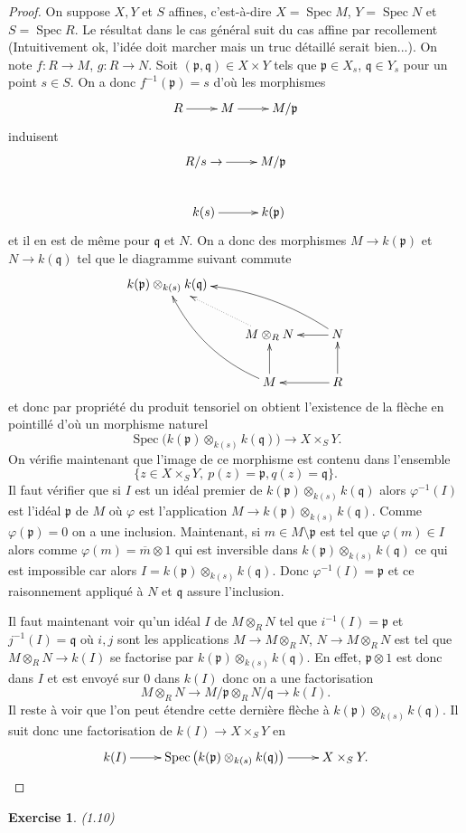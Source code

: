 \documentclass[A4, 11pt]{article}
\newtheorem{exer}{Exercise}
\def\Spec{ \operatorname{Spec}}
\begin{document}
 \begin{proof}
 On suppose $X,Y$ et $S$ affines, c'est-à-dire $X=\Spec M$, $Y=\Spec N$ et $S=\Spec R$. Le résultat dans le cas général suit du cas affine par recollement (Intuitivement ok, l'idée doit marcher mais un truc détaillé serait bien...).
On note $f\colon R\rightarrow M$, $g\colon R\rightarrow N$.
 Soit $(\mathfrak{p}, \mathfrak{q})\in X\times Y$ tels que $\mathfrak{p}\in X_s$, $\mathfrak{q}\in Y_s$ pour un point $s\in S$. On a donc $f^{-1}(\mathfrak{p})=s$ d'où les morphismes 
 $$\xymatrix{
R \ar[r]& M \ar[r] & M/\mathfrak{p} \\
 }$$ 
 induisent
  $$\xymatrix{
R/s \ar[r]\rightarrow & M/\mathfrak{p} \\
k(s) \ar[r] & k(\mathfrak{p})
 }$$ 
 et il en est de même pour $\mathfrak{q}$ et $N$. On a donc des morphismes $M\rightarrow k(\mathfrak{p})$ et $N\rightarrow k(\mathfrak{q})$ tel que le diagramme suivant commute
 $$\xymatrix{
k(\mathfrak{p}) \otimes_{k(s)} k(\mathfrak{q}) & & \\
 & M \otimes_R N \ar@{.>}[ul] & N \ar[l] \ar@/_1pc/[llu] \\
 &  M \ar[u] \ar@/^1pc/[luu] & R \ar[l] \ar[u]  
 }$$
 et donc par propriété du produit tensoriel on obtient l'existence de la flèche en pointillé d'où un morphisme naturel
 $$\Spec \big( k(\mathfrak{p}) \otimes_{k(s)} k(\mathfrak{q}) \big) \rightarrow X\times_S Y.$$
 On vérifie maintenant que l'image de ce morphisme est contenu dans l'ensemble 
 $$\{z\in X\times_S Y, ~p(z)=\mathfrak{p}, q(z)=\mathfrak{q}\}.$$
 Il faut vérifier que si $I$ est un idéal premier de $k(\mathfrak{p}) \otimes_{k(s)} k(\mathfrak{q})$ alors $\varphi^{-1}(I)$ est l'idéal $\mathfrak{p}$ de $M$ où $\varphi$ est l'application $M\rightarrow k(\mathfrak{p}) \otimes_{k(s)} k(\mathfrak{q})$. Comme $\varphi(\mathfrak{p})=0$ on a une inclusion. Maintenant, si $m\in M\setminus \mathfrak{p}$ est tel que $\varphi(m)\in I$ alors comme $\varphi(m)=\overline{m}\otimes 1$ qui est inversible dans $k(\mathfrak{p}) \otimes_{k(s)} k(\mathfrak{q})$ ce qui est impossible car alors $I=k(\mathfrak{p}) \otimes_{k(s)} k(\mathfrak{q})$. Donc $\varphi^{-1}(I)=\mathfrak{p}$ et ce raisonnement appliqué à $N$ et $\mathfrak{q}$ assure l'inclusion. 
 
 Il faut maintenant voir qu'un idéal $I$ de $M\otimes_R N$ tel que $i^{-1}(I)=\mathfrak{p}$ et $j^{-1}(I)=\mathfrak{q}$ où $i,j$ sont les applications $M\rightarrow M\otimes_R N$, $N\rightarrow M\otimes_R N$ est tel que $M\otimes_R N \rightarrow k(I)$ se factorise par $k(\mathfrak{p}) \otimes_{k(s)} k(\mathfrak{q})$. En effet, $\mathfrak{p}\otimes 1$ est donc dans $I$ et est envoyé sur $0$ dans $k(I)$ donc on a une factorisation
 $$M\otimes_R N\rightarrow M/\mathfrak{p} \otimes_R N/ \mathfrak{q} \rightarrow k(I).$$
 Il reste à voir que l'on peut étendre cette dernière flèche à $k(\mathfrak{p}) \otimes_{k(s)} k(\mathfrak{q})$. Il suit donc une factorisation de $k(I)\rightarrow X\times_S Y$ en
 $$ \xymatrix{
 k(I)\ar[r] & \Spec \big(k(\mathfrak{p}) \otimes_{k(s)} k(\mathfrak{q})\big)\ar[r] & X\times_S Y. 
 }$$
 \end{proof}
 \begin{exer}(1.10)
 \end{exer}
\end{document}
